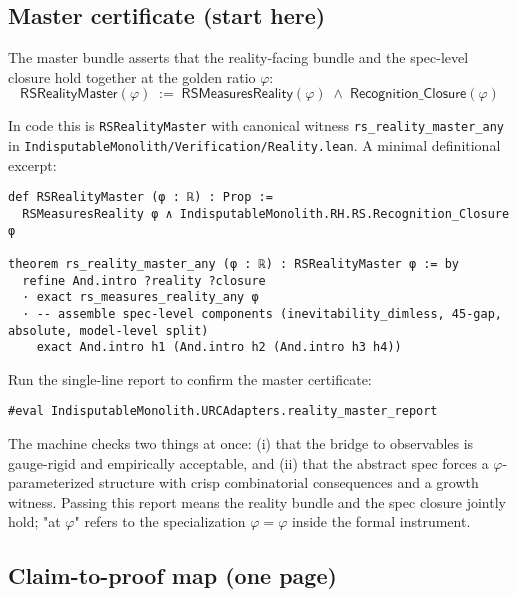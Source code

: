 \documentclass[11pt,a4paper,twoside]{article}
\numberwithin{equation}{section}
\newcommand{\phigr}{\varphi} %
\theoremstyle{customthm}
\theoremstyle{customdef}
\theoremstyle{customrem}
\begin{document}
\subsection{Master certificate (start here)}

\begin{importantbox}
The master bundle asserts that the reality-facing bundle and the spec-level closure hold together at the golden ratio $\varphi$:
\begin{equation}
\boxed{\mathsf{RSRealityMaster}(\varphi) \;:=\; \mathsf{RSMeasuresReality}(\varphi)\;\land\;\mathsf{Recognition\_Closure}(\varphi)}
\label{eq:master-cert}
\end{equation}
\end{importantbox}

\noindent
In code this is \texttt{RSRealityMaster} with canonical witness \texttt{rs\_reality\_master\_any} in \texttt{IndisputableMonolith/Verification/Reality.lean}. A minimal definitional excerpt:

\begin{lstlisting}
def RSRealityMaster (φ : ℝ) : Prop :=
  RSMeasuresReality φ ∧ IndisputableMonolith.RH.RS.Recognition_Closure φ

theorem rs_reality_master_any (φ : ℝ) : RSRealityMaster φ := by
  refine And.intro ?reality ?closure
  · exact rs_measures_reality_any φ
  · -- assemble spec-level components (inevitability_dimless, 45-gap, absolute, model-level split)
    exact And.intro h1 (And.intro h2 (And.intro h3 h4))
\end{lstlisting}

Run the single-line report to confirm the master certificate:

\begin{lstlisting}
#eval IndisputableMonolith.URCAdapters.reality_master_report
\end{lstlisting}

\begin{resultbox}[Meaning]
The machine checks two things at once: (i) that the bridge to observables is gauge-rigid and empirically acceptable, and (ii) that the abstract spec forces a $\varphi$-parameterized structure with crisp combinatorial consequences and a growth witness. Passing this report means the reality bundle and the spec closure jointly hold; "at $\varphi$" refers to the specialization $\varphi=\phigr$ inside the formal instrument.
\end{resultbox}

\subsection{Claim-to-proof map (one page)}
\end{document}
